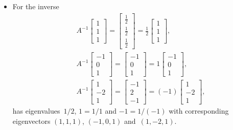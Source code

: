 \begin{example}
\begin{solution}
\begin{itemize}
\item For the inverse
\begin{eqnarray*}
&&A^{-1}\begin{bmatrix} 1\\1\\1 \end{bmatrix}
=\begin{bmatrix} \frac12\\\frac12\\\frac12 \end{bmatrix}
=\frac12\begin{bmatrix} 1\\1\\1 \end{bmatrix},
\\&&A^{-1}\begin{bmatrix} -1\\0\\1 \end{bmatrix}
=\begin{bmatrix} -1\\0\\1 \end{bmatrix}
=1\begin{bmatrix} -1\\0\\1 \end{bmatrix},
\\&&A^{-1}\begin{bmatrix} 1\\-2\\1 \end{bmatrix}
=\begin{bmatrix} -1\\2\\-1 \end{bmatrix}
=(-1)\begin{bmatrix} 1\\-2\\1 \end{bmatrix},
\end{eqnarray*}
has eigenvalues~\(1/2\), \(1=1/1\) and \(-1=1/(-1)\) with corresponding eigenvectors \((1,1,1)\),  \((-1,0,1)\) and~\((1,-2,1)\).

\end{itemize} 
\end{solution}
\end{example}




